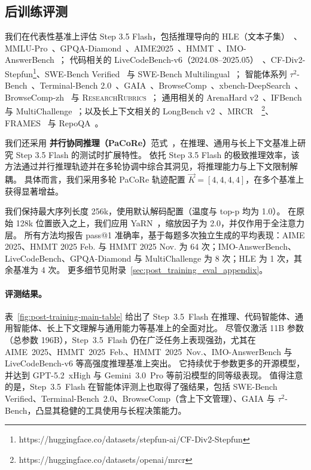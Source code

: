 \subsection{后训练评测}
我们在代表性基准上评估 Step 3.5 Flash，包括推理导向的 HLE（文本子集）~\cite{phan2025hle}、MMLU-Pro~\cite{wang2024mmlupro}、GPQA-Diamond~\cite{rein2023gpqa}、AIME2025~\cite{10.5555/3524938.3525416}、HMMT~\cite{hmmt25}、IMO-AnswerBench~\cite{luong2025towards}；
代码相关的 LiveCodeBench-v6（2024.08–2025.05）~\cite{jain2024livecodebench}、CF-Div2-Stepfun\footnote{https://huggingface.co/datasets/stepfun-ai/CF-Div2-Stepfun}、SWE-Bench Verified~\cite{swe_verified} 与 SWE-Bench Multilingual~\cite{yang2025swesmith}；
智能体系列 $\tau^2$-Bench~\cite{tau2bench2025}、Terminal-Bench 2.0~\cite{terminalbench2025}、GAIA~\cite{mialon2023gaiabenchmarkgeneralai}、BrowseComp~\cite{wei2025browsecomp}、xbench-DeepSearch~\cite{chen2025xbench}、BrowseComp-zh~\cite{zhou2025browsecompzhbenchmarkingwebbrowsing} 与 \textsc{ResearchRubrics}~\cite{sharma2025researchrubrics}；
通用相关的 ArenaHard v2~\cite{arenahard2024}、IFBench~\cite{pyatkin2025generalizing} 与 MultiChallenge~\cite{sirdeshmukh2025multichallengerealisticmultiturnconversation}；以及长上下文相关的 LongBench v2~\cite{bai2024longbenchv2}、MRCR~\cite{vodrahalli2024michelangelo}~\footnote{https://huggingface.co/datasets/openai/mrcr}、FRAMES~\cite{krishna2025fact} 与 RepoQA~\cite{liu2024repoqaevaluatinglongcontext}。

我们还采用 \textbf{并行协同推理（PaCoRe）}范式~\cite{hu2026pacorelearningscaletesttime}，在推理、通用与长上下文基准上研究 Step 3.5 Flash 的测试时扩展特性。
依托 Step 3.5 Flash 的极致推理效率，该方法通过并行推理轨迹并在多轮协调中综合其洞见，将推理能力与上下文限制解耦。
具体而言，我们采用多轮 PaCoRe 轨迹配置 $\vec{K} = [4,4,4,4]$，在多个基准上获得显著增益。

我们保持最大序列长度 256k，使用默认解码配置（温度与 top-p 均为 1.0）。
在原始 128k 位置嵌入之上，我们应用 YaRN~\cite{peng2023yarnefficientcontextwindow}，缩放因子为 2.0，并仅作用于全注意力层。
所有方法均报告 pass@1 准确率，基于每题多次独立生成的平均表现：AIME 2025、HMMT 2025 Feb. 与 HMMT 2025 Nov. 为 64 次；IMO-AnswerBench、LiveCodeBench、GPQA-Diamond 与 MultiChallenge 为 8 次；HLE 为 1 次，其余基准为 4 次。
更多细节见附录~\ref{sec:post_training_eval_appendix}。

\paragraph{评测结果。} 表~\ref{fig:post-training-main-table} 给出了 Step~3.5~Flash 在推理、代码智能体、通用智能体、长上下文理解与通用能力等基准上的全面对比。
尽管仅激活 11B 参数（总参数 196B），Step~3.5~Flash 仍在广泛任务上表现强劲，尤其在 AIME~2025、HMMT~2025~Feb.、HMMT~2025~Nov.、IMO-AnswerBench 与 LiveCodeBench-v6 等高强度推理基准上突出。
它持续优于参数更多的开源模型，并达到 GPT-5.2~xHigh 与 Gemini~3.0~Pro 等前沿模型的同等级表现。
值得注意的是，Step~3.5~Flash 在智能体评测上也取得了强结果，包括 SWE-Bench Verified、Terminal-Bench~2.0、BrowseComp（含上下文管理）、GAIA 与 $\tau^2$-Bench，凸显其稳健的工具使用与长程决策能力。

\begingroup
\renewcommand{\arraystretch}{1.1}

\endgroup
